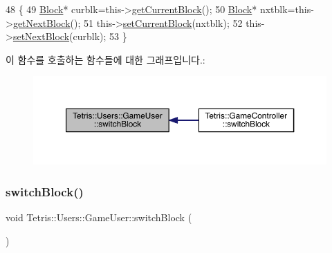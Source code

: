 \begin{DoxyCode}
48                                           \{
49                     \hyperlink{class_tetris_1_1_block}{Block}* curblk=this->\hyperlink{class_tetris_1_1_users_1_1_game_user_a3d4bcc74d518c28356012f8a42b85896}{getCurrentBlock}();
50                     \hyperlink{class_tetris_1_1_block}{Block}* nxtblk=this->\hyperlink{class_tetris_1_1_users_1_1_game_user_a9300608a38f8a3b10f9d6b6bdaeaab18}{getNextBlock}();
51                     this->\hyperlink{class_tetris_1_1_users_1_1_game_user_ae1743f8024d25ed74d7b2e456907ee41}{setCurrentBlock}(nxtblk);
52                     this->\hyperlink{class_tetris_1_1_users_1_1_game_user_a6249d0f4e9d77edd94935a74bbd298d5}{setNextBlock}(curblk);
53                 \}
\end{DoxyCode}
이 함수를 호출하는 함수들에 대한 그래프입니다.\+:
\nopagebreak
\begin{figure}[H]
\begin{center}
\leavevmode
\includegraphics[width=350pt]{d8/d9a/class_tetris_1_1_users_1_1_game_user_a1d1efa857420c82248fd12da9c08ef77_icgraph}
\end{center}
\end{figure}
\mbox{\label{class_tetris_1_1_users_1_1_game_user_a1d1efa857420c82248fd12da9c08ef77}} 
\subsubsection{\texorpdfstring{switch\+Block()}{switchBlock()}\hspace{0.1cm}{\footnotesize\ttfamily [2/2]}}
{\footnotesize\ttfamily void Tetris\+::\+Users\+::\+Game\+User\+::switch\+Block (\begin{DoxyParamCaption}{ }\end{DoxyParamCaption})\hspace{0.3cm}{\ttfamily [inline]}}

